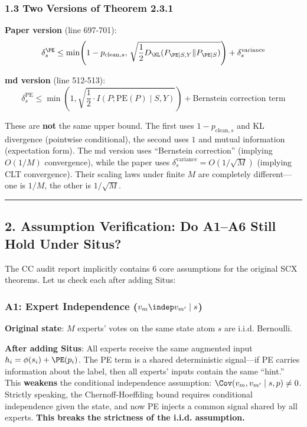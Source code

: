 \documentclass[
  12pt,
]{article}
\begin{document}
\subsubsection{1.3 Two Versions of Theorem 2.3.1}\label{two-versions-theorem-231}

\textbf{Paper version} (line 697-701):
\[\delta_s^{\PE} \leq \min\!\left(1 - p_{\text{clean}, s},\, \sqrt{\frac{1}{2} D_{\KL}(P_{\PE|S,Y} \| P_{\PE|S})}\right) + \delta_s^{\text{variance}}\]

\textbf{md version} (line 512-513):
\[\delta_s^{\text{PE}} \leq \min\left(1, \sqrt{\frac{1}{2} \cdot I(P; \text{PE}(P) \mid S, Y)}\right) + \text{Bernstein correction term}\]

These are \textbf{not} the same upper bound. The first uses \(1-p_{\text{clean},s}\) and KL divergence (pointwise conditional), the second uses \(1\) and mutual information (expectation form). The md version uses ``Bernstein correction'' (implying \(O(1/M)\) convergence), while the paper uses \(\delta_s^{\text{variance}} = O(1/\sqrt{M})\) (implying CLT convergence). Their scaling laws under finite \(M\) are completely different---one is \(1/M\), the other is \(1/\sqrt{M}\).

\begin{center}\rule{0.5\linewidth}{0.5pt}\end{center}

\subsection{2. Assumption Verification: Do A1--A6 Still Hold Under Situs?}\label{assumption-verification}

The CC audit report implicitly contains 6 core assumptions for the original SCX theorems. Let us check each after adding Situs:

\subsubsection{A1: Expert Independence (\(v_m \indep v_{m'} \mid s\))}\label{a1-expert-independence}

\textbf{Original state}: \(M\) experts' votes on the same state atom \(s\) are i.i.d. Bernoulli.

\textbf{After adding Situs}: All experts receive the same augmented input \(h_i = \phi(s_i) + \PE(p_i)\). The PE term is a shared deterministic signal---if PE carries information about the label, then all experts' inputs contain the same ``hint.'' This \textbf{weakens} the conditional independence assumption: \(\Cov(v_m, v_{m'} \mid s, p) \neq 0\). Strictly speaking, the Chernoff-Hoeffding bound requires conditional independence given the state, and now PE injects a common signal shared by all experts. \textbf{This breaks the strictness of the i.i.d. assumption.}
\end{document}
